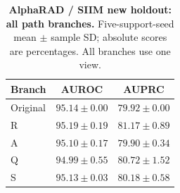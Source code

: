 \begin{table}[tp]
\centering
\caption{\textbf{AlphaRAD / SIIM new holdout: all path branches.} Five-support-seed mean $\pm$ sample SD; absolute scores are percentages. All branches use one view.}
\label{tab:supp-path-siim_new_holdout}
\small
\setlength{\tabcolsep}{4pt}
\begin{tabular*}{\textwidth}{@{\extracolsep{\fill}}lcc@{}}
\toprule
Branch & AUROC & AUPRC \\
\midrule
Original & $95.14\pm0.00$ & $79.92\pm0.00$ \\
R & $95.19\pm0.19$ & $81.17\pm0.89$ \\
A & $95.10\pm0.17$ & $79.90\pm0.34$ \\
Q & $94.99\pm0.55$ & $80.72\pm1.52$ \\
S & $95.13\pm0.03$ & $80.18\pm0.58$ \\
\bottomrule
\end{tabular*}
\end{table}
